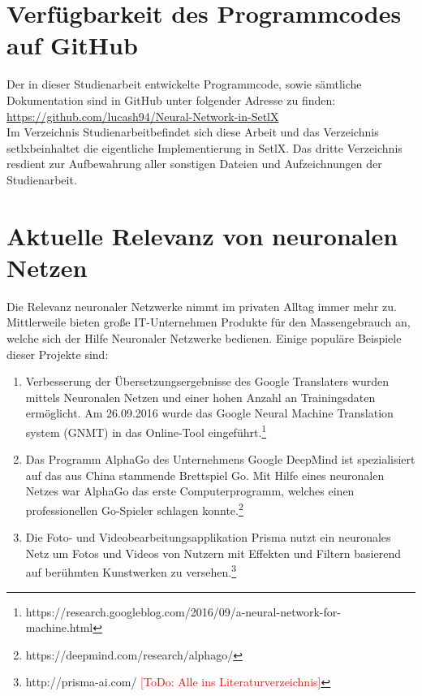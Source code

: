 \section{Verfügbarkeit des Programmcodes auf GitHub}
Der in dieser Studienarbeit entwickelte Programmcode, sowie sämtliche Dokumentation sind in GitHub unter folgender Adresse zu finden:
\\[0.2cm]
\hspace*{1.3cm}
\href{https://github.com/lucash94/Neural-Network-in-SetlX/}{https://github.com/lucash94/Neural-Network-in-SetlX}
\\[0.2cm]
Im Verzeichnis \glqq Studienarbeit\grqq befindet sich diese Arbeit und das Verzeichnis \glqq setlx\grqq beinhaltet die eigentliche Implementierung in SetlX. Das dritte Verzeichnis \glqq res\grqq dient zur Aufbewahrung aller sonstigen Dateien und Aufzeichnungen der Studienarbeit.

\section{Aktuelle Relevanz von neuronalen Netzen}
Die Relevanz neuronaler Netzwerke nimmt im privaten Alltag immer mehr zu. Mittlerweile bieten große IT-Unternehmen Produkte für den Massengebrauch an, welche sich der Hilfe Neuronaler Netzwerke bedienen. Einige populäre Beispiele dieser Projekte sind:
\begin{enumerate}
\item Verbesserung der Übersetzungsergebnisse des Google Translaters wurden mittels Neuronalen Netzen und einer hohen Anzahl an Trainingsdaten ermöglicht. Am 26.09.2016 wurde das Google Neural Machine Translation system (GNMT) in das Online-Tool eingeführt.\footnote{https://research.googleblog.com/2016/09/a-neural-network-for-machine.html}
\item Das Programm AlphaGo des Unternehmens Google DeepMind ist spezialisiert auf das aus China stammende Brettspiel Go. Mit Hilfe eines neuronalen Netzes war AlphaGo das erste Computerprogramm, welches einen professionellen Go-Spieler schlagen konnte.\footnote{https://deepmind.com/research/alphago/}
\item Die Foto- und Videobearbeitungsapplikation Prisma nutzt ein neuronales Netz um Fotos und Videos von Nutzern mit Effekten und Filtern basierend auf berühmten Kunstwerken zu versehen.\footnote{http://prisma-ai.com/ \textcolor{red}{[ToDo: Alle ins Literaturverzeichnis]}}
\end{enumerate}


